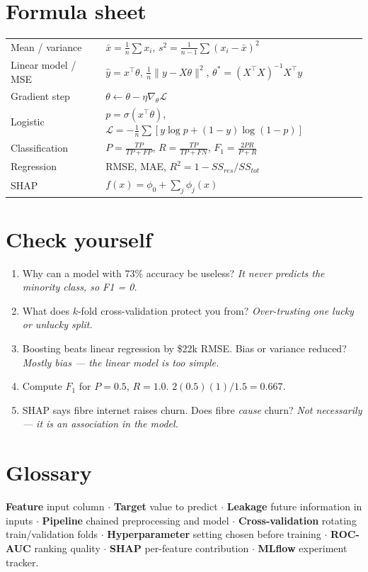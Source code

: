 \documentclass[11pt,a4paper]{article}
\begin{document}
\section*{Formula sheet}
\begin{tabularx}{\linewidth}{@{}l X@{}}
\toprule
Mean / variance & $\bar x=\frac1n\sum x_i$, \; $s^2=\frac1{n-1}\sum(x_i-\bar x)^2$\\
Linear model / MSE & $\hat y=x^\top\theta$, \; $\frac1n\lVert y-X\theta\rVert^2$, \; $\theta^\ast=(X^\top X)^{-1}X^\top y$\\
Gradient step & $\theta\leftarrow\theta-\eta\nabla_\theta\mathcal{L}$\\
Logistic & $p=\sigma(x^\top\theta)$, \; $\mathcal{L}=-\frac1n\sum[y\log p+(1-y)\log(1-p)]$\\
Classification & $P=\frac{TP}{TP+FP}$, \; $R=\frac{TP}{TP+FN}$, \; $F_1=\frac{2PR}{P+R}$\\
Regression & RMSE, MAE, \; $R^2=1-SS_{res}/SS_{tot}$\\
SHAP & $f(x)=\phi_0+\sum_j\phi_j(x)$\\
\bottomrule
\end{tabularx}

\section*{Check yourself}
\begin{enumerate}
\item Why can a model with 73\% accuracy be useless? \emph{It never predicts the minority class, so F1 = 0.}
\item What does $k$-fold cross-validation protect you from? \emph{Over-trusting one lucky or unlucky split.}
\item Boosting beats linear regression by \$22k RMSE. Bias or variance reduced? \emph{Mostly bias --- the linear model is too simple.}
\item Compute $F_1$ for $P=0.5$, $R=1.0$. \emph{$2(0.5)(1)/1.5=0.667$.}
\item SHAP says fibre internet raises churn. Does fibre \emph{cause} churn? \emph{Not necessarily --- it is an association in the model.}
\end{enumerate}

\section*{Glossary}
\textbf{Feature} input column $\cdot$ \textbf{Target} value to predict $\cdot$ \textbf{Leakage} future information in inputs $\cdot$ \textbf{Pipeline} chained preprocessing and model $\cdot$ \textbf{Cross-validation} rotating train/validation folds $\cdot$ \textbf{Hyperparameter} setting chosen before training $\cdot$ \textbf{ROC-AUC} ranking quality $\cdot$ \textbf{SHAP} per-feature contribution $\cdot$ \textbf{MLflow} experiment tracker.
\end{document}
